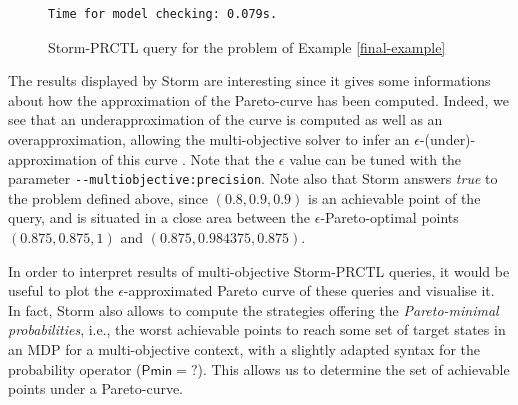 \begin{example}
\begin{figure}[h!]
{\begin{verbatim}
Time for model checking: 0.079s.
  \end{verbatim}
  }
    \vspace{-2em}
    \caption{Storm-PRCTL query for the \SSPPQ{} problem of Example \ref{final-example}}
    \label{ssppq-program}
  \end{figure}
The results displayed by Storm are interesting since it gives some informations about how the approximation of the Pareto-curve has been computed.
Indeed, we see that an underapproximation of the curve is computed as well as an overapproximation,
allowing the multi-objective solver to infer an $\epsilon$-(under)-approximation of this curve .
Note that the $\epsilon$ value can be tuned %
with the parameter {\small \color{umons-red}\verb|--multiobjective:precision|}.
Note also that Storm answers \textit{true} to the \SSPPQ{} problem defined above, since $(0.8, 0.9, 0.9)$ is an achievable point of the query, and is situated in a close area between the $\epsilon$-Pareto-optimal points $(0.875, 0.875, 1)$ and $(0.875, 0.984375, 0.875)$.

\end{example}

In order to interpret results of multi-objective Storm-PRCTL queries, it would be useful to plot the $\epsilon$-approximated Pareto curve of these queries and visualise it.
In fact, Storm also allows to compute the strategies offering the \textit{Pareto-minimal probabilities}, i.e., the worst achievable points to reach some set of target states in an MDP for a multi-objective context, with a slightly adapted syntax for the probability operator ($
  \mathsf{Pmin=?}
$).
This allows us to determine the set of achievable points under a Pareto-curve.

